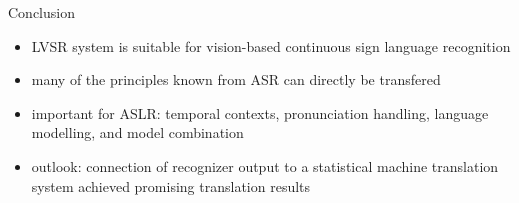 \documentclass[final,t]{beamer}
\begin{document}
\begin{frame}{}
\begin{columns}[t]
\begin{column}{.3\linewidth}
      \begin{block}{Conclusion}
        \begin{itemize}
        \item LVSR system is suitable for vision-based continuous sign language recognition
        \item many of the principles known from ASR can directly be transfered 
        \item important for ASLR: temporal contexts, pronunciation handling, language modelling, and model combination
        \item \alert{outlook:} connection of recognizer output to a
          statistical machine translation system achieved promising
          translation results
        \end{itemize}
        \vspace{-1ex}
      \end{block}

    \end{column}
  \end{columns}
\end{frame}
\end{document}
